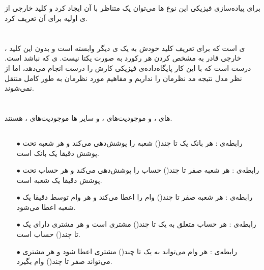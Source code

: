 \documentclass{article}
\begin{document}
\subsection{}
برای پیاده‌سازی فیزیکی این نوع ها می‌توان یک  متناظر با آن  ایجاد کرد و کلید خارجی از ی اولیه برای آن تعریف کرد.

\section{}
، ی است که برای تعریف کلید خودش به یک ی دیگر وابسته است و بدون این کلید خارجی قادر به مشخص کردن هر رکورد به صورت یکتا نیست. ی که  نباشد  است. درست است که با این کار پایگاه‌داده‌ی فیزیکی کارش را درست انجام می‌دهد، اما از نظر مدل نتیجه مد نظرمان را نداریم و مفاهیم مورد نظرمان به طور کامل منتقل نمی‌شوند.
\section{}
\subsection{}
های ،  و  موجودیت‌های ، و سایر ها موجودیت‌های ، هستند.
\subsection{}
\begin{itemize}
    \item [$\bullet$] رابطه‌ی :
هر بانک یک تا چند() شعبه را پوشش‌دهی می‌کند و هر شعبه تحت پوشش دقیقا یک بانک است.
    \item [$\bullet$] رابطه‌ی :
هر شعبه صفر تا چند() حساب را پوشش‌دهی می‌کند و هر حساب تحت پوشش دقیقا یک شعبه است.
    \item [$\bullet$] رابطه‌ی :
هر شعبه صفر تا چند() وام را اعطا می‌کند و هر وام توسط دقیقا یک شعبه اعطا می‌شود.
    \item [$\bullet$] رابطه‌ی :
هر حساب متعلق به یک تا چند() مشتری است و هر مشتری دارای یک تا چند() حساب است.
    \item [$\bullet$] رابطه‌ی :
هر وام می‌تواند به یک تا چند() مشتری اعطا شود و هر مشتری می‌تواند صفر تا چند() وام بگیرد.

\end{itemize}
\end{document}
